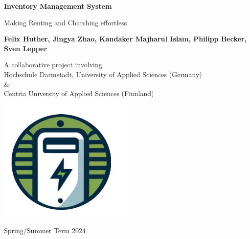 \begin{titlepage}
    \begin{center}
            
        \Huge
        \textbf{Inventory Management System}
            
        \vspace{0.3cm}
        \Large
        Making Renting and Charching effortless
            
        \vspace{1.0cm}
            
        \textbf{
        Felix Huther,
        Jingya Zhao,
        Kandaker Majharul Islam,
        Philipp Becker,
        Sven Lepper }
          
        \vfill            
        A collaborative project involving\\
        Hochschule Darmstadt, University of Applied Sciences (Germany) \\\&\\
        Centria University of Applied Sciences (Finnland)

        \vspace{0.5cm}
            
        \includegraphics[width=0.5\textwidth]{images/logo.png}

            
        \Large
      
        Spring/Summer Term 2024
            
    \end{center}
\end{titlepage}

